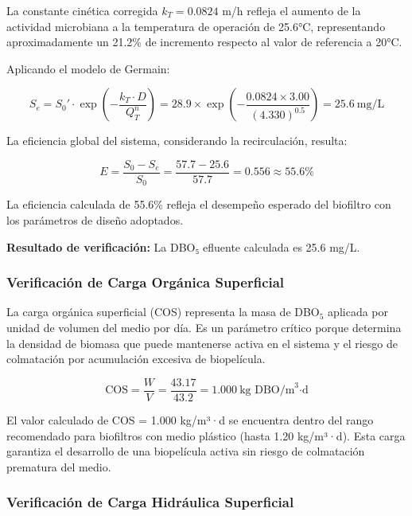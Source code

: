 \documentclass[12pt,a4paper]{article}
\begin{document}
La constante cinética corregida $k_T = 0.0824$ m/h refleja el aumento de la actividad microbiana a la temperatura de operación de 25.6°C, representando aproximadamente un 21.2\% de incremento respecto al valor de referencia a 20°C.

Aplicando el modelo de Germain:

\begin{equation}
S_e = S_0' \cdot \exp\!\left(-\frac{k_T \cdot D}{Q_T^n}\right) = 28.9 \times \exp\!\left(-\frac{0.0824 \times 3.00}{(4.330)^{0.5}}\right) = 25.6\ \text{mg/L}
\end{equation}

La eficiencia global del sistema, considerando la recirculación, resulta:

\begin{equation}
E = \frac{S_0 - S_e}{S_0} = \frac{57.7 - 25.6}{57.7} = 0.556 \approx 55.6\%
\end{equation}

La eficiencia calculada de 55.6\% refleja el desempeño esperado del biofiltro con los parámetros de diseño adoptados.

\textbf{Resultado de verificación:} La DBO₅ efluente calculada es 25.6 mg/L.

\subsubsection*{Verificación de Carga Orgánica Superficial}

La carga orgánica superficial (COS) representa la masa de DBO$_5$ aplicada por unidad de volumen del medio por día. Es un parámetro crítico porque determina la densidad de biomasa que puede mantenerse activa en el sistema y el riesgo de colmatación por acumulación excesiva de biopelícula.

\begin{equation}
\text{COS} = \frac{W}{V} = \frac{43.17}{43.2} = 1.000\ \text{kg DBO/m}^3\text{·d}
\end{equation}

El valor calculado de COS = 1.000 kg/m³·d se encuentra dentro del rango recomendado para biofiltros con medio plástico (hasta 1.20 kg/m³·d). Esta carga garantiza el desarrollo de una biopelícula activa sin riesgo de colmatación prematura del medio.

\subsubsection*{Verificación de Carga Hidráulica Superficial}
\end{document}
